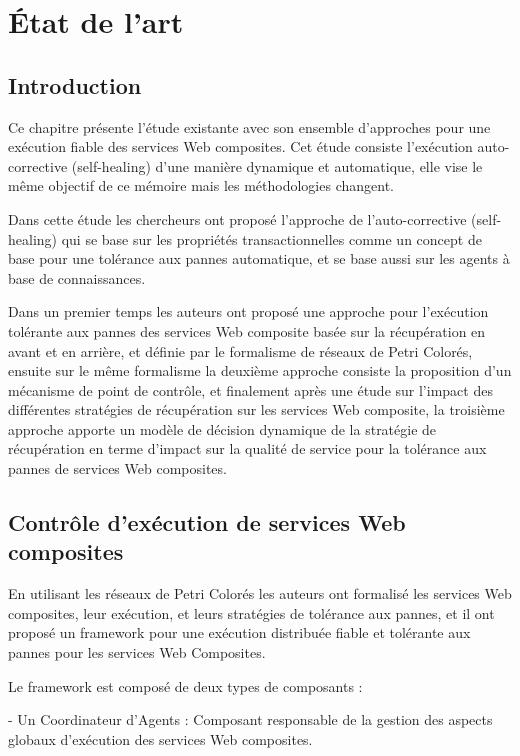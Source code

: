 
\vspace{1cm}

\chapter{État de l'art}

\section{Introduction}

Ce chapitre présente l'étude existante avec son ensemble d'approches pour une exécution fiable des services Web composites.
Cet étude consiste l'exécution auto-corrective (self-healing) d'une manière dynamique et automatique, elle vise le même objectif de ce mémoire mais les méthodologies changent. 

Dans cette étude les chercheurs ont proposé l'approche de l'auto-corrective  (self-healing) qui se base sur les propriétés transactionnelles comme un concept de base pour une tolérance aux pannes automatique, et se base aussi sur les agents à base de connaissances.

Dans un premier temps les auteurs ont proposé une approche pour l'exécution tolérante aux pannes des services Web composite basée sur la récupération en avant et en arrière, et définie par le formalisme de réseaux de Petri Colorés, ensuite sur le même formalisme la deuxième approche consiste la proposition d'un mécanisme de point de contrôle, et finalement après une étude sur l'impact des différentes stratégies de récupération sur les services Web composite, la troisième approche apporte un modèle de décision dynamique de la stratégie de récupération en terme d'impact sur la qualité de service pour la tolérance aux pannes de services Web composites.


\section{Contrôle d'exécution de services Web composites}

En utilisant les réseaux de Petri Colorés les auteurs ont formalisé les services Web composites, leur exécution, et leurs stratégies de tolérance aux pannes, et il ont proposé un framework pour une exécution distribuée fiable et tolérante aux pannes pour les services Web Composites.

Le framework est composé de deux types de composants \cite{1} \cite{5}: 

- Un Coordinateur d'Agents : Composant responsable de la gestion des aspects globaux d'exécution des services Web composites.

